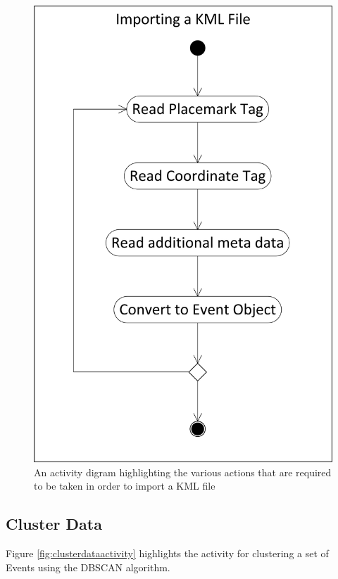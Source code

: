 \begin{figure}[H]
  \centering
    \includegraphics[scale=0.9]{chapter7/activity/import_kml.png}
    \caption[Importing a KML File activity diagram]
            {An activity digram highlighting the various actions that are 
             required to be taken in order to import a KML file}
    \label{fig:importkmlactivity}
\end{figure}


\subsection{Cluster Data}
Figure \ref{fig:clusterdataactivity} highlights the activity for clustering a 
set of Events using the DBSCAN algorithm. 

